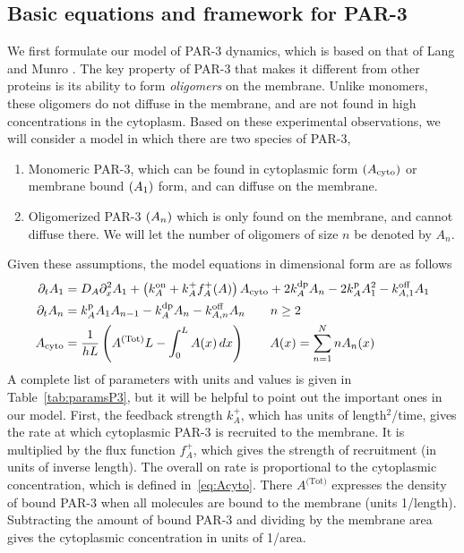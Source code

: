 \documentclass[11pt]{article}
\newcommand{\6}[1]{#1_{\text{6}}}
\newcommand{\3}[1]{#1_{\text{3}}}
\newcommand{\Tot}[1]{#1^\text{(Tot)}}
\newcommand{\A}[1]{#1_A}
\begin{document}
\subsection{Basic equations and framework for PAR-3 \label{sec:Par3}}
We first formulate our model of PAR-3 dynamics, which is based on that of Lang and Munro \cite{lang2022oligomerization}. The key property of PAR-3 that makes it different from other proteins is its ability to form \emph{oligomers} on the membrane. Unlike monomers, these oligomers do not diffuse in the membrane, and are not found in high concentrations in the cytoplasm. Based on these experimental observations, we will consider a model in which there are two species of PAR-3, 
\begin{enumerate}
\item Monomeric PAR-3, which can be found in cytoplasmic form $(A_\text{cyto})$ or membrane bound $(A_1)$ form, and can diffuse on the membrane.
\item Oligomerized PAR-3 $(A_n)$ which is only found on the membrane, and cannot diffuse there. We will let the number of oligomers of size $n$ be denoted by $A_n$. 
\end{enumerate}
Given these assumptions, the model equations in dimensional form are as follows
\begin{subequations}
\label{eq:P3model}
\begin{align}
\Dt \MA & = \A{D} \Dx^2 \MA + \left(\A{\kon}+\A{\kf}\A{f}^+(A)\right)  \MAC + 2\A{\kdp}\PA -2\A{\kp} \MA^2 - \koff_{A,1}\MA \\
\Dt A_n & =\A{\kp}\MA A_{n-1}- \A{\kdp}A_n-\koff_{A,n}A_n \qquad n \geq 2 \\ \label{eq:Acyto}
A_\text{cyto} & = \frac{1}{h L} \left(\Tot{A} L - \int_0^L A(x) \, dx \right) \qquad A(x) =\sum_{n=1}^N n A_n(x)
\end{align}
\end{subequations}
A complete list of parameters with units and values is given in Table\ \ref{tab:paramsP3}, but it will be helpful to point out the important ones in our model. First, the feedback strength $k_A^+$, which has units of length$^2$/time, gives the rate at which cytoplasmic PAR-3 is recruited to the membrane. It is multiplied by the flux function $f_A^+$, which gives the strength of recruitment (in units of inverse length). The overall on rate is proportional to the cytoplasmic concentration, which is defined in\ \eqref{eq:Acyto}. There $\Tot{A}$ expresses the density of bound PAR-3 when all molecules are bound to the membrane (units 1/length). Subtracting the amount of bound PAR-3 and dividing by the membrane area gives
the cytoplasmic concentration in units of 1/area.
\end{document}
